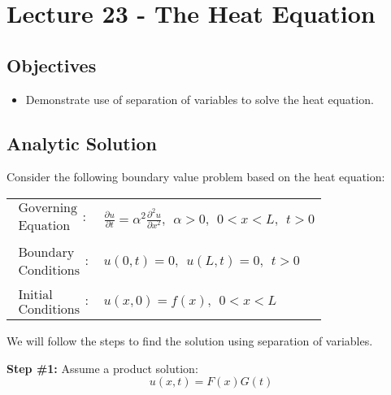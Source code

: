 \chapter{Lecture 23 - The Heat Equation}
\label{ch:lec23}
\section{Objectives}
\begin{itemize}
\item Demonstrate use of separation of variables to solve the heat equation.
\end{itemize}
\section{Analytic Solution}
Consider the following boundary value problem based on the heat equation:
\begin{table}
\begin{tabular}{l l}
$\substack{\text{Governing} \\\text{Equation}}: $& $\frac{\partial u}{\partial t} = \alpha^2 \frac{\partial^2 u}{\partial x^2}, \ \ \alpha>0, \ \ 0<x<L, \ \ t>0$ \\
& \\
$\substack{\text{Boundary} \\ \text{Conditions}}: $& $u(0,t)=0, \ \ u(L,t) = 0, \ \ t>0$\\
& \\
$\substack{\text{Initial} \\ \text{Conditions}}: $ & $u(x,0) = f(x), \ \ 0<x<L $ \\
\end{tabular}
\end{table}

\vspace{0.25cm}

\noindent We will follow the steps to find the solution using separation of variables.

\vspace{0.5cm}

\noindent\textbf{Step \#1:} Assume a product solution:
\begin{equation*}
u(x,t) = F(x)G(t)
\end{equation*}

